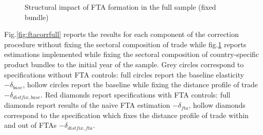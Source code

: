 \documentclass[12pt,twoside,a4paper,notitlepage]{article}
\begin{document}
\begin{figure}[h!]
\caption{Structural impact of FTA formation in the full sample (fixed bundle) \label{fig:ftacorrfullc63}}
\begin{center}
\setlength{\fboxrule}{1pt} %
\setlength{\fboxsep}{.1in} %
\end{center}
\end{figure}  

Fig.\ref{fig:ftacorrfull} reports the results for each component of the correction procedure without fixing the sectoral composition of trade while fig.\ref{fig:ftacorrfullc63} reports estimations implemented while fixing the sectoral composition of country-specific product bundles to the initial year of the sample.
Grey circles correspond to specifications without FTA controls: full circles report the baseline elasticity $-\delta_{base}$, hollow circles report the baseline while fixing the distance profile of trade  $-\delta_{distfix,base}$.
Red diamonds report specifications with FTA controls: full diamonds report results of the naive FTA estimation $-\delta_{fta}$,  hollow diamonds correspond to the specification which fixes the distance profile of trade within and out of FTAs $-\delta_{distfix,fta}$.
\end{document}
